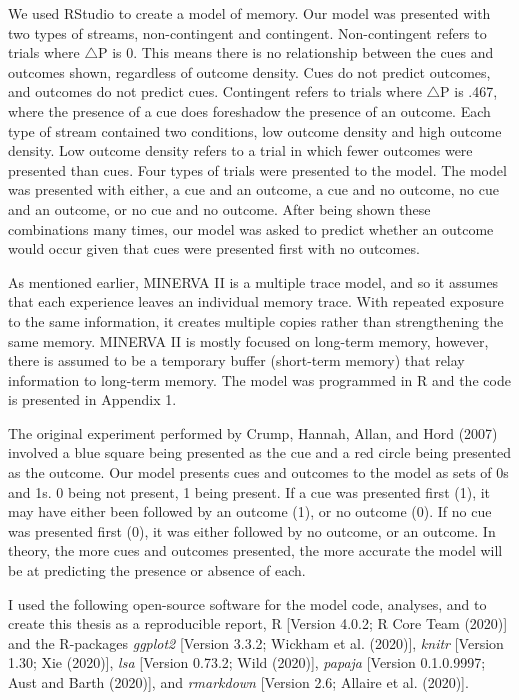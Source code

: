 \documentclass[
  english,
  man,floatsintext]{apa6}
\begin{document}
We used RStudio to create a model of memory. Our model was presented with two types of streams, non-contingent and contingent. Non-contingent refers to trials where \(\triangle\)P is 0. This means there is no relationship between the cues and outcomes shown, regardless of outcome density. Cues do not predict outcomes, and outcomes do not predict cues. Contingent refers to trials where \(\triangle\)P is .467, where the presence of a cue does foreshadow the presence of an outcome. Each type of stream contained two conditions, low outcome density and high outcome density. Low outcome density refers to a trial in which fewer outcomes were presented than cues. Four types of trials were presented to the model. The model was presented with either, a cue and an outcome, a cue and no outcome, no cue and an outcome, or no cue and no outcome. After being shown these combinations many times, our model was asked to predict whether an outcome would occur given that cues were presented first with no outcomes.

As mentioned earlier, MINERVA II is a multiple trace model, and so it assumes that each experience leaves an individual memory trace. With repeated exposure to the same information, it creates multiple copies rather than strengthening the same memory. MINERVA II is mostly focused on long-term memory, however, there is assumed to be a temporary buffer (short-term memory) that relay information to long-term memory. The model was programmed in R and the code is presented in Appendix 1.

The original experiment performed by Crump, Hannah, Allan, and Hord (2007) involved a blue square being presented as the cue and a red circle being presented as the outcome. Our model presents cues and outcomes to the model as sets of 0s and 1s. 0 being not present, 1 being present. If a cue was presented first (1), it may have either been followed by an outcome (1), or no outcome (0). If no cue was presented first (0), it was either followed by no outcome, or an outcome. In theory, the more cues and outcomes presented, the more accurate the model will be at predicting the presence or absence of each.

I used the following open-source software for the model code, analyses, and to create this thesis as a reproducible report, R {[}Version 4.0.2; R Core Team (2020){]} and the R-packages \emph{ggplot2} {[}Version 3.3.2; Wickham et al. (2020){]}, \emph{knitr} {[}Version 1.30; Xie (2020){]}, \emph{lsa} {[}Version 0.73.2; Wild (2020){]}, \emph{papaja} {[}Version 0.1.0.9997; Aust and Barth (2020){]}, and \emph{rmarkdown} {[}Version 2.6; Allaire et al. (2020){]}.
\end{document}
